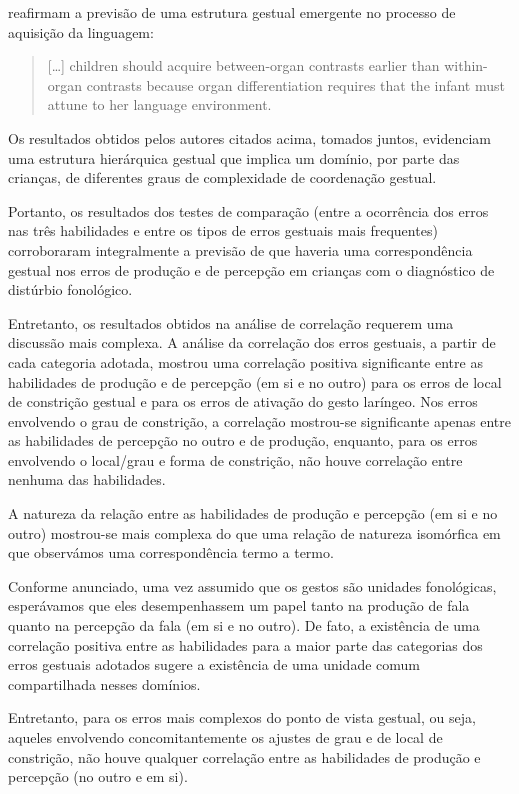 \documentclass[output=paper,colorlinks,citecolor=brown,booklanguage=portuguese]{langscibook}
\begin{document}
\citet[224]{Goldstein2007} reafirmam a previsão de uma estrutura gestual emergente no processo de aquisição da linguagem:
\begin{quote}
    […] children should acquire between-organ contrasts earlier than within-organ contrasts because organ differentiation requires that the infant must attune to her language environment.
\end{quote}
Os resultados obtidos pelos autores citados acima, tomados juntos, evidenciam uma estrutura hierárquica gestual que implica um domínio, por parte das crianças, de diferentes graus de complexidade de coordenação gestual.

Portanto, os resultados dos testes de comparação (entre a ocorrência dos erros nas três habilidades e entre os tipos de erros gestuais mais frequentes) corroboraram integralmente a previsão de que haveria uma correspondência gestual nos erros de produção e de percepção em crianças com o diagnóstico de distúrbio fonológico.

Entretanto, os resultados obtidos na análise de correlação requerem uma discussão mais complexa. A análise da correlação dos erros gestuais, a partir de cada categoria adotada, mostrou uma correlação positiva significante entre as habilidades de produção e de percepção (em si e no outro) para os erros de local de constrição gestual e para os erros de ativação do gesto laríngeo. Nos erros envolvendo o grau de constrição, a correlação mostrou-se significante apenas entre as habilidades de percepção no outro e de produção, enquanto, para os erros envolvendo o local/grau e forma de constrição, não houve correlação entre nenhuma das habilidades.

A natureza da relação entre as habilidades de produção e percepção (em si e no outro) mostrou-se mais complexa do que uma relação de natureza isomórfica em que observámos uma correspondência termo a termo.

Conforme anunciado, uma vez assumido que os gestos são unidades fonológicas, esperávamos que eles desempenhassem um papel tanto na produção de fala quanto na percepção da fala (em si e no outro). De fato, a existência de uma correlação positiva entre as habilidades para a maior parte das categorias dos erros gestuais adotados sugere a existência de uma unidade comum compartilhada nesses domínios.

Entretanto, para os erros mais complexos do ponto de vista gestual, ou seja, aqueles envolvendo concomitantemente os ajustes de grau e de local de constrição, não houve qualquer correlação entre as habilidades de produção e percepção (no outro e em si).
\end{document}
